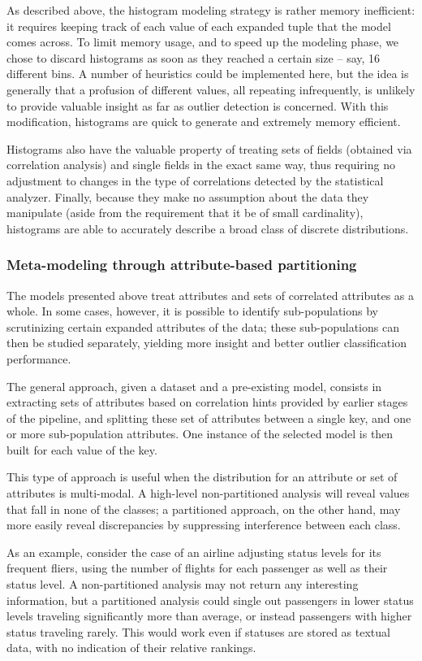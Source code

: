 As described above, the histogram modeling strategy is rather memory inefficient: it requires keeping track of each value of each expanded tuple that the model comes across. To limit memory usage, and to speed up the modeling phase, we chose to discard histograms as soon as they reached a certain size -- say, 16 different bins. A number of heuristics could be implemented here, but the idea is generally that a profusion of different values, all repeating infrequently, is unlikely to provide valuable insight as far as outlier detection is concerned. With this modification, histograms are quick to generate and extremely memory efficient. 

Histograms also have the valuable property of treating sets of fields (obtained via correlation analysis) and single fields in the exact same way, thus requiring no adjustment to changes in the type of correlations detected by the statistical analyzer. Finally, because they make no assumption about the data they manipulate (aside from the requirement that it be of small cardinality), histograms are able to accurately describe a broad class of discrete distributions.

\subsubsection{Meta-modeling through attribute-based partitioning}
The models presented above treat attributes and sets of correlated attributes as a whole. In some cases, however, it is possible to identify sub-populations by scrutinizing certain expanded attributes of the data; these sub-populations can then be studied separately, yielding more insight and better outlier classification performance.

The general approach, given a dataset and a pre-existing model, consists in extracting sets of attributes based on correlation hints provided by earlier stages of the pipeline, and splitting these set of attributes between a single key, and one or more sub-population attributes. One instance of the selected model is then built for each value of the key. 

This type of approach is useful when the distribution for an attribute or set of attributes is multi-modal. A high-level non-partitioned analysis will reveal values that fall in none of the classes; a partitioned approach, on the other hand, may more easily reveal discrepancies by suppressing interference between each class.

As an example, consider the case of an airline adjusting status levels for its frequent fliers, using the number of flights for each passenger as well as their status level. A non-partitioned analysis may not return any interesting information, but a partitioned analysis could single out passengers in lower status levels traveling significantly more than average, or instead passengers with higher status traveling rarely. This would work even if statuses are stored as textual data, with no indication of their relative rankings.

